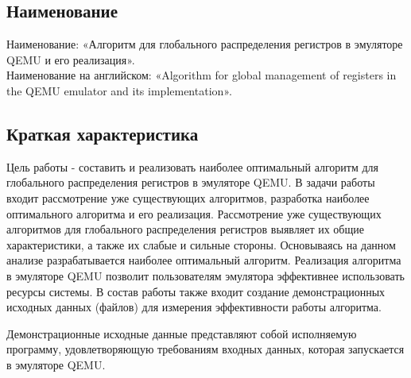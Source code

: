 \subsection{Наименование}
Наименование: «Алгоритм для глобального распределения регистров в эмуляторе QEMU и его реализация». \\
Наименование на английском: «Algorithm for global management of registers in the QEMU emulator and its implementation». \\


\subsection{Краткая характеристика}
    Цель работы - составить и реализовать наиболее оптимальный алгоритм для глобального распределения регистров в эмуляторе QEMU.
    В задачи работы входит рассмотрение уже существующих алгоритмов, разработка наиболее оптимального алгоритма и его реализация.
    Рассмотрение уже существующих алгоритмов для глобального распределения регистров выявляет их общие характеристики, а также их слабые и сильные стороны. Основываясь на данном анализе разрабатывается наиболее оптимальный алгоритм. 
    Реализация алгоритма в эмуляторе QEMU позволит пользователям эмулятора эффективнее использовать ресурсы системы.
    В состав работы также входит создание демонстрационных исходных данных (файлов) для измерения эффективности работы алгоритма.

\smallskip
Демонстрационные исходные данные представляют собой исполняемую программу, удовлетворяющую требованиям входных данных, которая запускается в эмуляторе QEMU.
